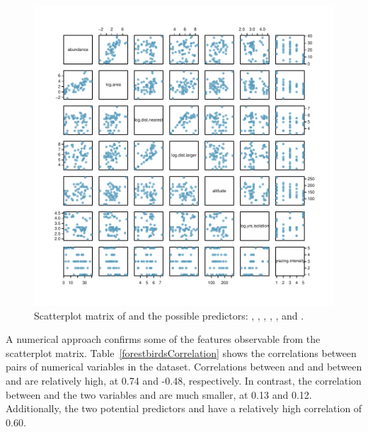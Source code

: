 \begin{figure}[h!]
 	\centering
 	\includegraphics[width=\textwidth, height=0.75\textheight]
{ch_multiple_linear_regression_oi_biostat/figures/forestbirdsScatterPlotMatrix/forestbirdsScatterPlotMatrix.pdf}
     \caption{Scatterplot matrix of  and the possible predictors:  , , , , , and .}
    	\label{forestbirdsScatterPlotMatrix}
\end{figure} 

A numerical approach confirms some of the features observable from the scatterplot matrix. Table~\ref{forestbirdsCorrelation} shows the correlations between pairs of numerical variables in the dataset. Correlations between  and  and between  and  are relatively high, at 0.74 and -0.48, respectively. In contrast, the correlation between  and the two variables  and  are much smaller, at 0.13 and 0.12. Additionally, the two potential predictors  and  have a relatively high correlation of 0.60.

